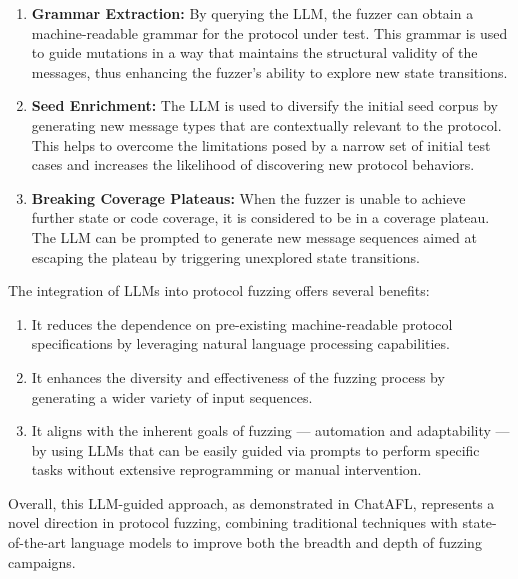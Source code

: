 \begin{enumerate}
    \item \textbf{Grammar Extraction:} By querying the LLM, the fuzzer can obtain a machine-readable grammar for the protocol under test. This grammar is used to guide mutations in a way that maintains the structural validity of the messages, thus enhancing the fuzzer's ability to explore new state transitions.

    \item \textbf{Seed Enrichment:} The LLM is used to diversify the initial seed corpus by generating new message types that are contextually relevant to the protocol. This helps to overcome the limitations posed by a narrow set of initial test cases and increases the likelihood of discovering new protocol behaviors.

    \item \textbf{Breaking Coverage Plateaus:} When the fuzzer is unable to achieve further state or code coverage, it is considered to be in a coverage plateau. The LLM can be prompted to generate new message sequences aimed at escaping the plateau by triggering unexplored state transitions.
\end{enumerate}
The integration of LLMs into protocol fuzzing offers several benefits:
\begin{enumerate}
    \item It reduces the dependence on pre-existing machine-readable protocol specifications by leveraging natural language processing capabilities.
    \item It enhances the diversity and effectiveness of the fuzzing process by generating a wider variety of input sequences.
    \item It aligns with the inherent goals of fuzzing — automation and adaptability — by using LLMs that can be easily guided via prompts to perform specific tasks without extensive reprogramming or manual intervention.
\end{enumerate}
Overall, this LLM-guided approach, as demonstrated in ChatAFL, represents a novel direction in protocol fuzzing, combining traditional techniques with state-of-the-art language models to improve both the breadth and depth of fuzzing campaigns.


